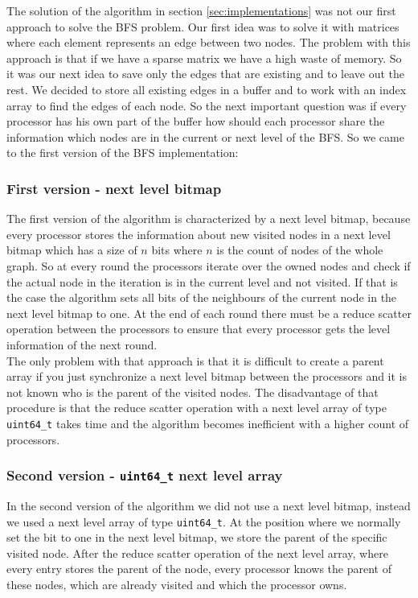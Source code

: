 \documentclass[12pt,a4paper]{article}
\begin{document}
The solution of the algorithm in section \ref{sec:implementations} was not our first approach to solve the BFS problem. Our first idea was to solve it with matrices where each element represents an edge between two nodes. The problem with this approach is that if we have a sparse matrix we have a high waste of memory. So it was our next idea to save only the edges that are existing and to leave out the rest. We decided to store all existing edges in a buffer and to work with an index array to find the edges of each node. So the next important question was if every processor has his own part of the buffer how should each processor share the information which nodes are in the current or next level of the BFS. So we came to the first version of the BFS implementation:

\subsubsection{First version - next level bitmap}

The first version of the algorithm is characterized by a next level bitmap, because every processor stores the information about new visited nodes in a next level bitmap which has a size of \(n\) bits where \(n\) is the count of nodes of the whole graph. So at every round the processors iterate over the owned nodes and check if the actual node in the iteration is in the current level and not visited. If that is the case the algorithm sets all bits of the neighbours of the current node in the next level bitmap to one. At the end of each round there must be a reduce scatter operation between the processors to ensure that every processor gets the level information of the next round.\\
The only problem with that approach is that it is difficult to create a parent array if you just synchronize a next level bitmap between the processors and it is not known who is the parent of the visited nodes. The disadvantage of that procedure is that the reduce scatter operation with a next level array of type \lstinline{uint64_t} takes time and the algorithm becomes inefficient with a higher count of processors.

\subsubsection{Second version - \lstinline{uint64_t} next level array}

In the second version of the algorithm we did not use a next level bitmap, instead we used a next level array of type \lstinline{uint64_t}. At the position where we normally set the bit to one in the next level bitmap, we store the parent of the specific visited node. After the reduce scatter operation of the next level array, where every entry stores the parent of the node, every processor knows the parent of these nodes, which are already visited and which the processor owns.
\end{document}
